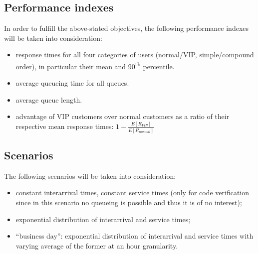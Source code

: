 \subsection{Performance indexes}
In order to fulfill the above-stated objectives, the following performance 
indexes will be taken into consideration:
\begin{itemize}
    \item response times for all four categories of users (normal/VIP, 
    simple/compound order), in particular their mean and 90\textsuperscript{th} 
    percentile.
    \item average queueing time for all queues.
    \item average queue length.
    \item advantage of VIP customers over normal customers as a ratio of their respective mean response times: $1-{\frac{E[R_{VIP}]}{E[R_{normal}]}}$
\end{itemize}

\subsection{Scenarios}
The following scenarios will be taken into consideration:
\begin{itemize}
    \item constant interarrival times, constant service times (only for code verification since in this scenario no queueing is possible and thus it is of no interest);
    \item exponential distribution of interarrival and service times;
    \item ``business day'': exponential distribution of interarrival and service times with varying average of the former at an hour granularity.
\end{itemize}
